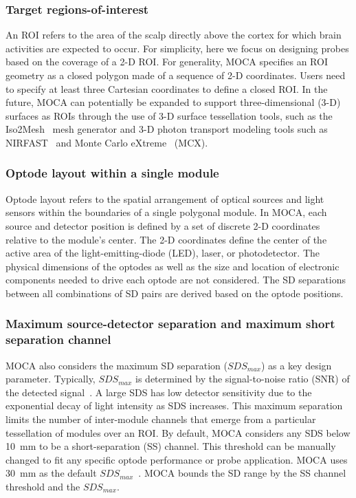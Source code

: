 \subsubsection{Target regions-of-interest}
An \ac{ROI} refers to the area of the scalp directly above the cortex for which brain activities are expected to occur\cite{Hiroyasu2015}. For simplicity, here we focus on designing probes based on the coverage of a 2-D \ac{ROI}. For generality, \ac{MOCA} specifies an \ac{ROI} geometry as a closed polygon made of a sequence of 2-D coordinates. Users need to specify at least three Cartesian coordinates to define a closed \ac{ROI}. In the future, \ac{MOCA} can potentially be expanded to support three-dimensional (3-D) surfaces as \ac{ROI}s through the use of 3-D surface tessellation tools, such as the Iso2Mesh~\cite{Fang2009a} mesh generator and 3-D photon transport modeling tools such as NIRFAST~\cite{Nirfast} and Monte Carlo eXtreme~\cite{Fang2009} (MCX).

\subsubsection{Optode layout within a single module}
Optode layout refers to the spatial arrangement of optical sources and light sensors within the boundaries of a single polygonal module. In \ac{MOCA}, each source and detector position is defined by a set of discrete 2-D coordinates relative to the module's center. The 2-D coordinates define the center of the active area of the light-emitting-diode (LED), laser, or photodetector. The physical dimensions of the optodes as well as the size and location of electronic components needed to drive each optode are not considered. The \ac{SD} separations between all combinations of \ac{SD} pairs are derived based on the optode positions.

\subsubsection{Maximum source-detector separation and maximum short separation channel}
\ac{MOCA} also considers the maximum \ac{SD} separation ($SDS_{max}$) as a key design parameter. Typically, $SDS_{max}$ is determined by the signal-to-noise ratio (SNR) of the detected signal~\cite{Arnulphi2009}. A large \ac{SDS} has low detector sensitivity due to the exponential decay of light intensity as \ac{SDS} increases. This maximum separation limits the number of inter-module channels that emerge from a particular tessellation of modules over an \ac{ROI}. By default, \ac{MOCA} considers any \ac{SDS} below 10~mm to be a short-separation (SS) channel. This threshold can be manually changed to fit any specific optode performance or probe application. \ac{MOCA} uses 30~mm as the default $SDS_{max}$~\cite{Taga2007, LloydFox2010}. \ac{MOCA} bounds the \ac{SD} range by the SS channel threshold and the $SDS_{max}$. 

